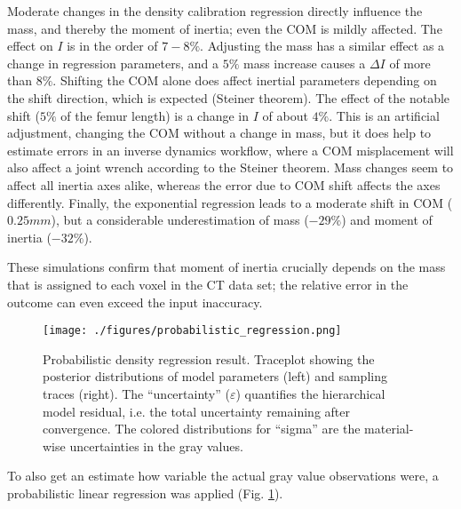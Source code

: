 Moderate changes in the density calibration regression directly influence the mass, and thereby the moment of inertia; even the COM is mildly affected.
The effect on \(I\) is in the order of \(7-8\%\).
Adjusting the mass has a similar effect as a change in regression parameters, and a \(5\%\) mass increase causes a \(\Delta I\) of more than \(8\%\).
Shifting the COM alone does affect inertial parameters depending on the shift direction, which is expected (Steiner theorem).
The effect of the notable shift (\(5\%\) of the femur length) is a change in \(I\) of about \(4\%\).
This is an artificial adjustment, changing the COM without a change in mass, but it does help to estimate errors in an inverse dynamics workflow, where a COM misplacement will also affect a joint wrench according to the Steiner theorem.
Mass changes seem to affect all inertia axes alike, whereas the error due to COM shift affects the axes differently.
Finally, the exponential regression leads to a moderate shift in COM (\(0.25 mm\)), but a considerable underestimation of mass (\(-29 \%\)) and moment of inertia (\(-32 \%\)).

These simulations confirm that moment of inertia crucially depends on the mass that is assigned to each voxel in the CT data set; the relative error in the outcome can even exceed the input inaccuracy.


\begin{figure}[htbp]
\centering
\texttt{[image: ./figures/probabilistic\_regression.png]}
\caption{\label{fig:probabilistic_density}Probabilistic density regression result. Traceplot showing the posterior distributions of model parameters (left) and sampling traces (right). The ``uncertainty'' (\(\varepsilon\)) quantifies the hierarchical model residual, i.e. the total uncertainty remaining after convergence. The colored distributions for ``sigma'' are the material-wise uncertainties in the gray values.}
\end{figure}

To also get an estimate how variable the actual gray value observations were, a probabilistic linear regression was applied (Fig. \ref{fig:probabilistic_density}).

